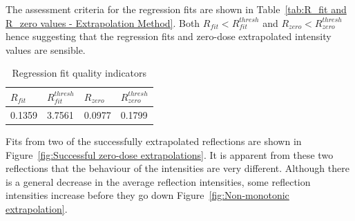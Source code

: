 The assessment criteria for the regression fits are shown in Table~\ref{tab:R_fit and R_zero values - Extrapolation Method}.
Both $R_{fit} < R^{thresh}_{fit}$ and $R_{zero} < R^{thresh}_{zero}$ hence suggesting that the regression fits and zero-dose extrapolated intensity values are sensible.
\begin{table}[ht!]
	\caption{Regression fit quality indicators}
	\centering
	\begin{tabular}{p{1.5cm} | p{1.5cm} | p{1.5cm} | p{1.5cm}}
		$R_{fit}$     & $R^{thresh}_{fit}$    & $R_{zero}$   & $R^{thresh}_{zero}$  \\
		\hline
		0.1359        & 3.7561                & 0.0977       & 0.1799        \\
	\end{tabular}
	\label{tab:R_fit and R_zero values}
\end{table}
Fits from two of the successfully extrapolated reflections are shown in Figure~\ref{fig:Successful zero-dose extrapolations}.
It is apparent from these two reflections that the behaviour of the intensities are very different.
Although there is a general decrease in the average reflection intensities, some reflection intensities increase before they go down Figure~\ref{fig:Non-monotonic extrapolation}.
